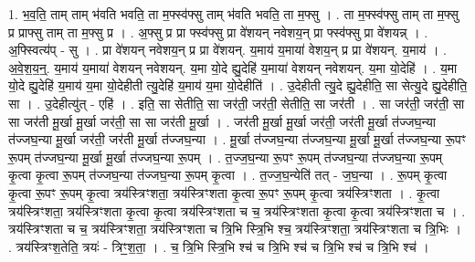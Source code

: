 \documentclass[17pt]{extarticle}
\begin{document}
1. भ॒व॒ति॒ ताम् ताम् भ॑वति भवति॒ ता म॒फ्स्व॑फ्सु ताम् भ॑वति भवति॒ ता म॒फ्सु । . ता म॒फ्स्व॑फ्सु ताम् ता म॒फ्सु प्र प्राफ्सु ताम् ता म॒फ्सु प्र । . अ॒फ्सु प्र प्रा फ्स्व॑फ्सु प्रा वे॑शयन् नवेशय॒न् प्रा फ्स्व॑फ्सु प्रा वे॑शयन्न् । . अ॒फ्स्वित्य॑प् - सु । . प्रा वे॑शयन् नवेशय॒न् प्र प्रा वे॑शयन्. य॒माय॑ य॒माया॑ वेशय॒न् प्र प्रा वे॑शयन्. य॒माय॑ । . अ॒वे॒श॒य॒न्॒. य॒माय॑ य॒माया॑ वेशयन् नवेशयन्. य॒मा यो॒दे ह्यु॒देहि॑ य॒माया॑ वेशयन् नवेशयन्. य॒मा यो॒देहि॑ । . य॒मा यो॒दे ह्यु॒देहि॑ य॒माय॑ य॒मा यो॒देहीती त्यु॒देहि॑ य॒माय॑ य॒मा यो॒देहीति॑ । . उ॒देहीती त्यु॒दे ह्यु॒देहीति॒ सा सेत्यु॒दे ह्यु॒देहीति॒ सा । . उ॒देहीत्यु॑त् - एहि॑ । . इति॒ सा सेतीति॒ सा जर॑ती॒ जर॑ती॒ सेतीति॒ सा जर॑ती । . सा जर॑ती॒ जर॑ती॒ सा सा जर॑ती मू॒र्खा मू॒र्खा जर॑ती॒ सा सा जर॑ती मू॒र्खा । . जर॑ती मू॒र्खा मू॒र्खा जर॑ती॒ जर॑ती मू॒र्खा त॑ज्जघ॒न्या त॑ज्जघ॒न्या मू॒र्खा जर॑ती॒ जर॑ती मू॒र्खा त॑ज्जघ॒न्या । . मू॒र्खा त॑ज्जघ॒न्या त॑ज्जघ॒न्या मू॒र्खा मू॒र्खा त॑ज्जघ॒न्या रू॒पꣳ रू॒पम् त॑ज्जघ॒न्या मू॒र्खा मू॒र्खा त॑ज्जघ॒न्या रू॒पम् । . त॒ज्ज॒घ॒न्या रू॒पꣳ रू॒पम् त॑ज्जघ॒न्या त॑ज्जघ॒न्या रू॒पम् कृ॒त्वा कृ॒त्वा रू॒पम् त॑ज्जघ॒न्या त॑ज्जघ॒न्या रू॒पम् कृ॒त्वा । . त॒ज्ज॒घ॒न्येति॑ तत् - ज॒घ॒न्या । . रू॒पम् कृ॒त्वा कृ॒त्वा रू॒पꣳ रू॒पम् कृ॒त्वा त्रय॑स्त्रिꣳशता॒ त्रय॑स्त्रिꣳशता कृ॒त्वा रू॒पꣳ रू॒पम् कृ॒त्वा त्रय॑स्त्रिꣳशता । . कृ॒त्वा त्रय॑स्त्रिꣳशता॒ त्रय॑स्त्रिꣳशता कृ॒त्वा कृ॒त्वा त्रय॑स्त्रिꣳशता च च॒ त्रय॑स्त्रिꣳशता कृ॒त्वा कृ॒त्वा त्रय॑स्त्रिꣳशता च । . त्रय॑स्त्रिꣳशता च च॒ त्रय॑स्त्रिꣳशता॒ त्रय॑स्त्रिꣳशता च त्रि॒भि स्त्रि॒भि श्च॒ त्रय॑स्त्रिꣳशता॒ त्रय॑स्त्रिꣳशता च त्रि॒भिः । . त्रय॑स्त्रिꣳश॒तेति॒ त्रयः॑ - त्रिꣳ॒॒श॒ता॒ । . च॒ त्रि॒भि स्त्रि॒भि श्च॑ च त्रि॒भि श्च॑ च त्रि॒भि श्च॑ च त्रि॒भि श्च॑ । \newline
\end{document}
